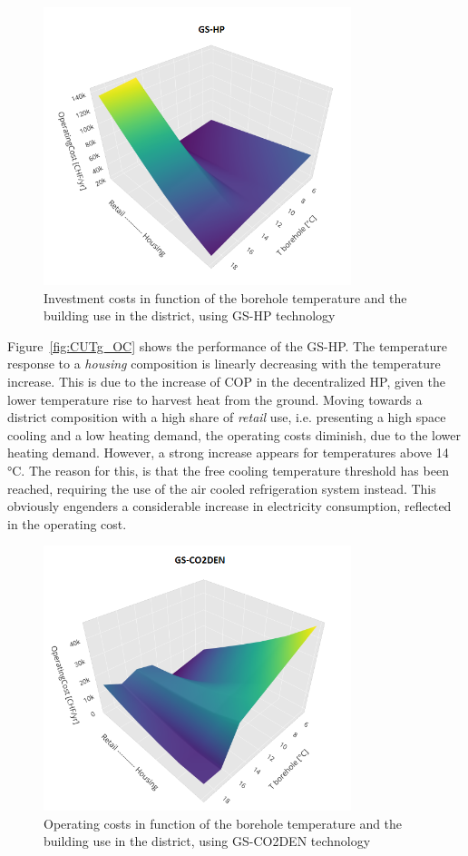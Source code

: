 \documentclass{article}
\begin{document}
\begin{figure}[htp]
	\centering
	\includegraphics[width=0.8\textwidth]{CUTg_SA_OC.png}
	\caption{Investment costs in function of the borehole temperature and the building use in the district, using GS-HP technology}
	\label{fig:CUTg_IC}
\end{figure}

Figure~\ref{fig:CUTg_OC} shows the performance of the GS-HP. The temperature response to a \textit{housing} composition is linearly decreasing with the temperature increase. This is due to the increase of COP in the decentralized HP, given the lower temperature rise to harvest heat from the ground. Moving towards a district composition with a high share of \textit{retail} use, i.e. presenting a high space cooling and a low heating demand, the operating costs diminish, due to the lower heating demand. However, a strong increase appears for temperatures above 14 \si{\celsius}. The reason for this, is that the free cooling temperature threshold has been reached, requiring the use of the air cooled refrigeration system instead. This obviously engenders a considerable increase in electricity consumption, reflected in the operating cost.

\begin{figure}[htp]
	\centering
	\includegraphics[width=0.8\textwidth]{CUTg_SA_CO2_OC.png}
	\caption{Operating costs in function of the borehole temperature and the building use in the district, using GS-CO2DEN technology}
	\label{fig:CUTg_CO2_OC}
\end{figure}
\end{document}
